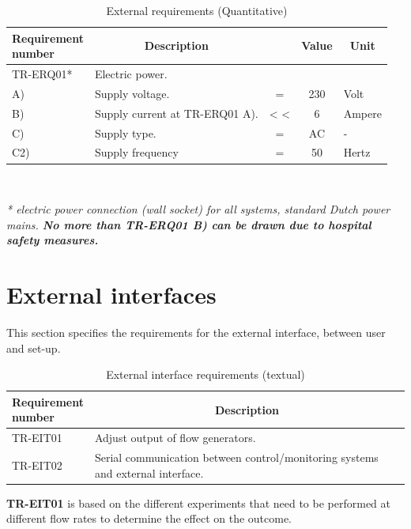 \begin{table}[H]
\caption{External requirements (Quantitative)}
\label{tab:extreq_quan}
\begin{tabular}{l|p{65mm}ccp{20mm}|}
	\makecell[l]{\textbf{Requirement} \\  \textbf{number}} & \multicolumn{1}{c}{\textbf{Description}} & \multicolumn{1}{c}{ } & \multicolumn{1}{c}{\textbf{Value}} & \multicolumn{1}{c}{\textbf{Unit}} \\
	\hline	
	TR-ERQ01* &  Electric power. &  &  &  \\
	\hspace{1.5cm} A) & Supply voltage. 	& = 	& 230 	& Volt \\
	\hspace{1.5cm} B) & Supply current at TR-ERQ01 A). 	& < < 	& 6		& Ampere \\
	\hspace{1.5cm} C) & Supply type. 		& = 	& AC 	& - \\
	\hspace{1.5cm} C2) & Supply frequency	& =		& 50	& Hertz \\
	\cline{2-5}
\end{tabular} \\
\raggedright
\textit{* electric power connection (wall socket) for all systems, standard Dutch power mains. \textbf{No more than TR-ERQ01 B) can be drawn due to hospital safety measures.}}
\end{table}

\section{External interfaces}
This section specifies the requirements for the external interface, between user and set-up.
\begin{table} [H]
\caption{External interface requirements (textual)}
\label{tab:extint_text}
\begin{tabular}{l|p{120mm}|}
	\makecell[l]{\textbf{Requirement} \\ \textbf{number}} & \multicolumn{1}{c}{\textbf{Description}}\\
	\hline
	TR-EIT01 & Adjust output of flow generators. \\
	TR-EIT02 & Serial communication between control/monitoring systems and external interface.\\
	\cline{2-2}
\end{tabular}
\end{table}

\textbf{TR-EIT01} is based on the different experiments that need to be performed at different flow rates to determine the effect on the outcome.


